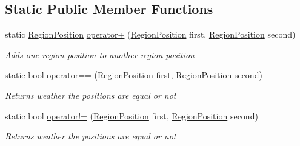 \subsection*{Static Public Member Functions}
\begin{DoxyCompactItemize}
\item 
static \hyperlink{classCore_1_1Models_1_1RegionPosition}{Region\+Position} \hyperlink{classCore_1_1Models_1_1RegionPosition_aab54c93c6d1a98929101e97539d3a0f7}{operator+} (\hyperlink{classCore_1_1Models_1_1RegionPosition}{Region\+Position} first, \hyperlink{classCore_1_1Models_1_1RegionPosition}{Region\+Position} second)
\begin{DoxyCompactList}\small\item\em Adds one region position to another region position \end{DoxyCompactList}\item 
static bool \hyperlink{classCore_1_1Models_1_1RegionPosition_a12c0ef336fb5cb8eac84a406d69f2539}{operator==} (\hyperlink{classCore_1_1Models_1_1RegionPosition}{Region\+Position} first, \hyperlink{classCore_1_1Models_1_1RegionPosition}{Region\+Position} second)
\begin{DoxyCompactList}\small\item\em Returns weather the positions are equal or not\end{DoxyCompactList}\item 
static bool \hyperlink{classCore_1_1Models_1_1RegionPosition_a37cdf9abf55b503335922bb671cb79b4}{operator!=} (\hyperlink{classCore_1_1Models_1_1RegionPosition}{Region\+Position} first, \hyperlink{classCore_1_1Models_1_1RegionPosition}{Region\+Position} second)
\begin{DoxyCompactList}\small\item\em Returns weather the positions are equal or not\end{DoxyCompactList}\end{DoxyCompactItemize}
